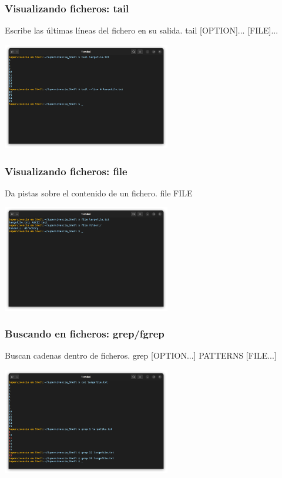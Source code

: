 \documentclass[10pt]{beamer}
\begin{document}
	\begin{frame}
		\frametitle{Visualizando ficheros: tail}
		\begin{alertblock}{Escribe las últimas líneas del fichero en su salida.}
			tail [OPTION]... [FILE]...
		\end{alertblock}
		\begin{center}
			\includegraphics[width=0.55\textwidth]{tail}
		\end{center}
	\end{frame}
		
	\begin{frame}
		\frametitle{Visualizando ficheros: file}
		\begin{alertblock}{Da pistas sobre el contenido de un fichero.}
			file FILE
		\end{alertblock}
		\begin{center}
			\includegraphics[width=0.55\textwidth]{file}
		\end{center}
	\end{frame}
		
	\begin{frame}
		\frametitle{Buscando en ficheros: grep/fgrep}
		\begin{alertblock}{Buscan cadenas dentro de ficheros.}
			grep [OPTION...] PATTERNS [FILE...]
		\end{alertblock}
		\begin{center}
			\includegraphics[width=0.55\textwidth]{grep}
		\end{center}
	\end{frame}
	
\end{document}
